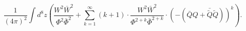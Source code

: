 \begin{equation}\label{integr}
\frac{1}{(4\pi)^{2}}\int d^8z(
\frac{W^2\bar{W}^2}{\Phi^2\bar{\Phi}^2} +
\sum_{k=1}^{\infty}(k+1)\cdot\frac{W^2\bar{W}^2}{\Phi^{2+k}\bar{\Phi}^{2+k}}
\cdot(-(\bar{Q}Q+\bar{\tilde{Q}}\tilde{Q}))^{k}).
\end{equation}

